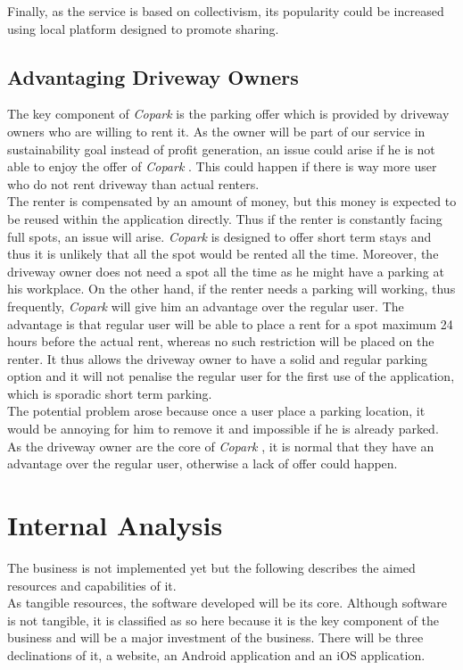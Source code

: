 \documentclass[12pt,a4paper,oneside]{book}
\newcommand{\bp}{\textit{Copark }}
\begin{document}
Finally, as the service is based on collectivism, its popularity could be increased using local platform designed to promote sharing.

\subsection{Advantaging Driveway Owners}

The key component of \bp is the parking offer which is provided by driveway owners who are willing to rent it. As the owner will be part of our service in sustainability goal instead of profit generation, an issue could arise if he is not able to enjoy the offer of \bp. This could happen if there is way more user who do not rent driveway than actual renters.\\

The renter is compensated by an amount of money, but this money is expected to be reused within the application directly. Thus if the renter is constantly facing full spots, an issue will arise. \bp is designed to offer short term stays and thus it is unlikely that all the spot would be rented all the time. Moreover, the driveway owner does not need a spot all the time as he might have a parking at his workplace. On the other hand, if the renter needs a parking will working, thus frequently, \bp will give him an advantage over the regular user. The advantage is that regular user will be able to place a rent for a spot maximum 24 hours before the actual rent, whereas no such restriction will be placed on the renter. It thus allows the driveway owner to have a solid and regular parking option and it will not penalise the regular user for the first use of the application, which is sporadic short term parking.\\

The potential problem arose because once a user place a parking location, it would be annoying for him to remove it and impossible if he is already parked. As the driveway owner are the core of \bp, it is normal that they have an advantage over the regular user, otherwise a lack of offer could happen.

\section{Internal Analysis}
The business is not implemented yet but the following describes the aimed resources and capabilities of it.\\

As tangible resources, the software developed will be its core. Although software is not tangible, it is classified as so here because it is the key component of the business and will be a major investment of the business. There will be three declinations of it, a website, an Android application and an iOS application.\\
\end{document}
